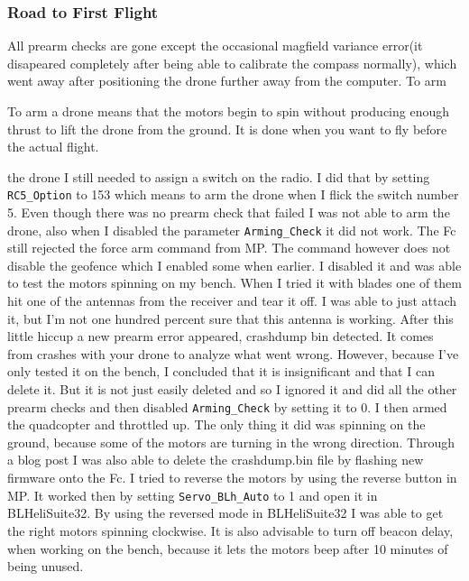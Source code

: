 \documentclass{article}
\begin{document}
	\subsubsection{Road to First Flight}
	All prearm checks are gone except the occasional magfield variance error(it disapeared completely after being able to calibrate the compass normally), which went away after positioning the drone further away from the computer. To arm
	\begin{Explanation}[to arm]
		\item To arm a drone means that the motors begin to spin without producing enough thrust to lift the drone from the ground. It is done when you want to fly before the actual flight.		
	\end{Explanation}
	the drone I still needed to assign a switch on the radio. I did that by setting \lstinline|RC5_Option| to 153 which means to arm the drone when I flick the switch number 5. Even though there was no prearm check that failed I was not able to arm the drone, also when I disabled the parameter \lstinline|Arming_Check| it did not work. The Fc still rejected the force arm command from MP. The command however does not disable the geofence which I enabled some when earlier. I disabled it and was able to test the motors spinning on my bench. When I tried it with blades one of them hit one of the antennas from the receiver and tear it off. I was able to just attach it, but I'm not one hundred percent sure that this antenna is working. After this little hiccup a new prearm error appeared, crashdump bin detected. It comes from crashes with your drone to analyze what went wrong. 
	However, because I've only tested it on the bench, I concluded that it is insignificant and that I can delete it. But it is not just easily deleted and so I ignored it and did all the other prearm checks and then disabled \lstinline|Arming_Check| by setting it to 0. I then armed the quadcopter and throttled up. The only thing it did was spinning on the ground, because some of the motors are turning in the wrong direction. Through a blog post\cite{blogcrashdump} I was also able to delete the crashdump.bin file by flashing new firmware onto the Fc. I tried to reverse the motors by using the reverse button in MP. It worked then by setting \lstinline|Servo_BLh_Auto| to 1 and open it in BLHeliSuite32\cite{BLHeliSuite32}. By using the reversed mode in BLHeliSuite32 I was able to get the right motors spinning clockwise. It is also advisable to turn off beacon delay, when working on the bench, because it lets the motors beep after 10 minutes of being unused.
	
\end{document}
